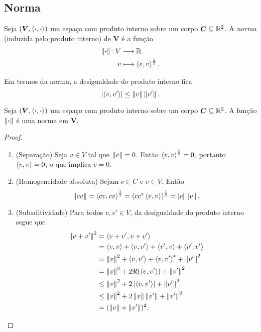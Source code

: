 \subsection{Norma}

\begin{definition}
Seja $(\bm V,\inte{\var}{\var})$ um espaço com produto interno sobre um corpo $\bm C \subseteq \R^2$. A \emph{norma} (induzida pelo produto interno) de $\bm V$ é a função
	\begin{align*}
	\func{\nor{\var}}{V}{\R}{v}{\inte{v}{v}^{\frac{1}{2}}}.
	\end{align*}
\end{definition}

Em termos da norma, a desigualdade do produto interno fica
	\begin{equation*}
	\abs{\inte{v}{v'}} \leq \nor{v}\nor{v'}.
	\end{equation*}

\begin{proposition}
Seja $(\bm V,\inte{\var}{\var})$ um espaço com produto interno sobre um corpo $\bm C \subseteq \R^2$. A função $\nor{\var}$ é uma norma em $\bm V$.
\end{proposition}
\begin{proof}
	\begin{enumerate}
	\item (Separação) Seja $v \in V$ tal que $\nor{v}=0$. Então $\inte{v}{v}^\frac{1}{2}=0$, portanto $\inte{v}{v}=0$, o que implica $v=0$.

	\item (Homogeneidade absoluta) Sejam $c \in C$ e $v \in V$. Então
	\begin{equation*}
	\nor{cv} = \inte{cv}{cv}^{\frac{1}{2}} = \left(c\conju{c}\inte{v}{v}\right)^{\frac{1}{2}} = \abs{c}\nor{v}.
	\end{equation*}

	\item (Subaditividade) Para todos $v,v' \in V$, da desigualdade do produto interno segue que
	\begin{align*}
	\nor{v+v'}^2 &= \inte{v+v'}{v+v'} \\
		&= \inte{v}{v}+\inte{v}{v'}+\inte{v'}{v}+\inte{v'}{v'} \\
		&=  \nor{v}^2+\inte{v}{v'}+\conju{\inte{v}{v'}}+\nor{v'}^2\\
		&= \nor{v}^2+2\Re(\inte{v}{v'})+\nor{v'}^2\\
		&\leq \nor{v}^2+2\abs{\inte{v}{v'}}+\nor{v'}^2\\
		&\leq \nor{v}^2 + 2\nor{v}\nor{v'}+\nor{v'}^2 \\
		&= (\nor{v} + \nor{v'})^2.
		\qedhere
	\end{align*}
	\end{enumerate}
\end{proof}

